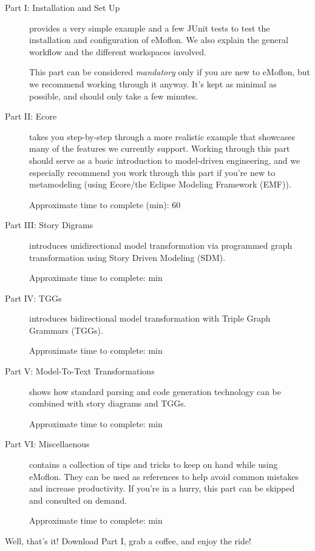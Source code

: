 \begin{description}

\item[Part I: Installation and Set Up] provides a very simple example and a few JUnit tests to test the installation and configuration of eMoflon. We also explain the general workflow and the different workspaces involved.

This part can be considered \emph{mandatory} only if you are new to eMoflon, but we recommend working through it anyway.
It's kept as minimal as possible, and should only take a few minutes.

\item[Part II: Ecore] takes you step-by-step through a more realistic example that showcases many of the features we currently support.
Working through this part should serve as a basic introduction to model-driven engineering, and we especially recommend you work through this part if you're new
to metamodeling (using Ecore/the Eclipse Modeling Framework (EMF)).

{\small Approximate time to complete (min): 60 }

\item[Part III: Story Digrams] introduces unidirectional model transformation via programmed graph transformation using Story Driven Modeling (SDM).

{\small Approximate time to complete: min }

\item[Part IV: TGGs] introduces bidirectional model transformation with Triple Graph Grammars (TGGs).

{\small Approximate time to complete: min }

\item[Part V: Model-To-Text Transformations] shows how standard parsing and code generation technology can be combined with story diagrams and TGGs.

{\small Approximate time to complete: min }

\item[Part VI: Miscellaenous] contains a collection of tips and tricks to keep on hand while using eMoflon. They can be used as references to help avoid common
mistakes and increase productivity. If you're in a hurry, this part can be skipped and consulted on demand.

{\small Approximate time to complete: min }

\end{description}

Well, that's it! Download Part I, grab a coffee, and enjoy the ride!
